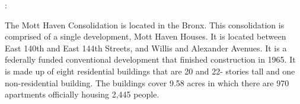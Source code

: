 :     

   

The Mott Haven Consolidation is located in the Bronx. This consolidation is comprised of a single development, Mott Haven Houses. It is located between East 140th and East 144th Streets, and Willis and Alexander Avenues. It is a federally funded conventional development that finished construction in 1965. It is made up of eight residential buildings that are 20 and 22- stories tall and one non-residential building. The buildings cover 9.58 acres in which there are 970 apartments officially housing 2,445 people. 